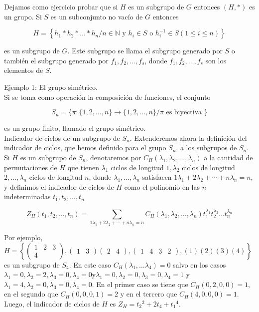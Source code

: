 \documentclass[10pt]{article}
\begin{document}
Dejamos como ejercicio probar que si $H$ es un subgrupo de $G$ entonces $(H, *)$ es un grupo. Si $S$ es un subconjunto no vacío de $G$ entonces

$$
H=\left\{h_{1} * h_{2} * \ldots * h_{n} / n \in \mathbb{N} \text { y } h_{i} \in S \text { o } h_{i}^{-1} \in S(1 \leq i \leq n)\right\}
$$

es un subgrupo de $G$. Este subgrupo se llama el subgrupo generado por $S$ o también el subgrupo generado por $f_{1}, f_{2}, \ldots, f_{s}$, donde $f_{1}, f_{2}, \ldots, f_{s}$ son los elementos de $S$.

Ejemplo 1: El grupo simétrico.\\
Si se toma como operación la composición de funciones, el conjunto

$$
S_{n}=\{\pi:\{1,2, \ldots, n\} \longrightarrow\{1,2, \ldots, n\} / \pi \text { es biyectiva }\}
$$

es un grupo finito, llamado el grupo simétrico.\\
Indicador de ciclos de un subgrupo de $S_{n}$. Extenderemos ahora la definición del indicador de ciclos, que hemos definido para el grupo $S_{n}$, a los subgrupos de $S_{n}$. Si $H$ es un subgrupo de $S_{n}$, denotaremos por $C_{H}\left(\lambda_{1}, \lambda_{2}, \ldots, \lambda_{n}\right)$ a la cantidad de permutaciones de $H$ que tienen $\lambda_{1}$ ciclos de longitud $1, \lambda_{2}$ ciclos de longitud $2, \ldots, \lambda_{n}$ ciclos de longitud $n$, donde $\lambda_{1}, \ldots, \lambda_{n}$ satisfacen $1 \lambda_{1}+2 \lambda_{2}+\cdots+n \lambda_{n}=n$, y definimos el indicador de ciclos de $H$ como el polinomio en las $n$ indeterminadas $t_{1}, t_{2}, \ldots, t_{n}$

$$
Z_{H}\left(t_{1}, t_{2}, \ldots, t_{n}\right)=\sum_{1 \lambda_{1}+2 \lambda_{2}+\cdots+n \lambda_{n}=n} C_{H}\left(\lambda_{1}, \lambda_{2}, \ldots, \lambda_{n}\right) t_{1}^{\lambda_{1}} t_{2}^{\lambda_{2}} \ldots t_{n}^{\lambda_{n}}
$$

Por ejemplo, $H=\left\{\left(\begin{array}{lll}1 & 2 & 3 \\ 4\end{array}\right),\left(\begin{array}{lll}1 & 3\end{array}\right)\left(\begin{array}{lll}2 & 4\end{array}\right),\left(\begin{array}{llll}1 & 4 & 3 & 2\end{array}\right),(1)(2)(3)(4)\right\}$ es un subgrupo de $S_{4}$. En este caso $C_{H}\left(\lambda_{1}, \ldots \lambda_{4}\right)=0$ salvo en los casos $\lambda_{1}=0, \lambda_{2}=2, \lambda_{3}=0, \lambda_{4}=0 \mathrm{y} \lambda_{1}=0, \lambda_{2}=0, \lambda_{3}=0, \lambda_{4}=1$ y $\lambda_{1}=4, \lambda_{2}=0, \lambda_{3}=0, \lambda_{4}=0$. En el primer caso se tiene que $C_{H}(0,2,0,0)=1$, en el segundo que $C_{H}(0,0,0,1)=2$ y en el tercero que $C_{H}(4,0,0,0)=1$. Luego, el indicador de ciclos de $H$ es $Z_{H}=t_{2}{ }^{2}+2 t_{4}+t_{1}{ }^{4}$.
\end{document}
